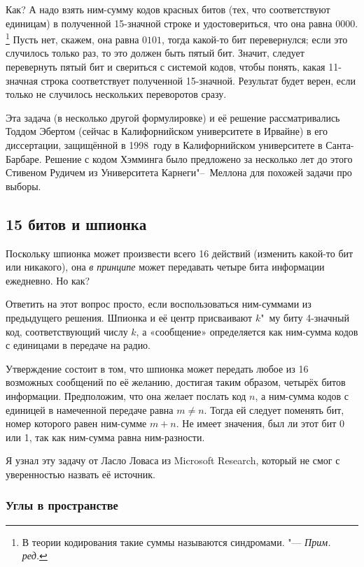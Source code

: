 \documentclass[twoside]{book}
\begin{document}
Как? А надо взять ним-сумму кодов красных битов (тех, что соответствуют единицам) в полученной 15-значной строке и удостовериться, что она равна $0000$. \footnote{В теории кодирования такие суммы называются синдромами. "--- \emph{Прим. ред.}}
Пусть нет, скажем, она равна $0101$,
тогда какой-то бит перевернулся;
если это случилось только раз, то это должен быть пятый бит.
Значит, следует перевернуть пятый бит и свериться с системой кодов, чтобы понять, какая 11-значная строка соответствует полученной 15-значной.
Результат будет верен, если только не случилось нескольких переворотов сразу.

\medskip

Эта задача (в несколько другой формулировке) и её решение рассматривались Тоддом Эбертом (сейчас в Калифорнийском университете в Ирвайне) в его диссертации, защищённой в 1998~году в Калифорнийском университете в Санта-Барбаре.
Решение с кодом Хэмминга было предложено за несколько лет до этого Стивеном Рудичем из Университета Карнеги"--~Меллона  для похожей задачи про выборы.

\subsection*{15 битов и шпионка}

Поскольку шпионка может произвести всего 16 действий (изменить какой-то бит или никакого),  она \emph{в принципе} может передавать четыре бита информации ежедневно.
Но как?

Ответить на этот вопрос просто, если воспользоваться ним-суммами из предыдущего решения.
Шпионка и её центр присваивают $k$"~му биту 4-значный код, соответствующий числу $k$, а «сообщение» определяется как ним-сумма кодов с единицами в передаче на радио.

Утверждение состоит в том, что шпионка может передать любое из 16 возможных сообщений по её желанию,
достигая таким образом, четырёх битов информации.
Предположим, что она желает послать код $n$, а ним-сумма кодов с единицей в намеченной передаче равна $m\ne n$.
Тогда ей следует поменять бит, номер которого равен ним-сумме $m+n$.
Не имеет значения, был ли этот бит 0 или 1, так как ним-сумма равна ним-разности.
\heart

\medskip

Я узнал эту задачу от Ласло Ловаса из Microsoft Research, который не смог с уверенностью назвать её источник.

\subsubsection*{Углы в пространстве}
\end{document}
